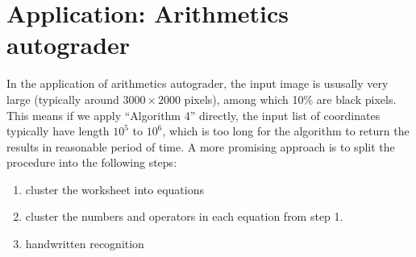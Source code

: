 
\section{Application: Arithmetics autograder}
In the application of arithmetics autograder, the input image is ususally very large (typically around \(3000\times2000\) pixels), among which 10\% are black pixels.
This means if we apply ``Algorithm 4'' directly, the input list of coordinates typically have length \(10^5\) to \(10^6\), which is too long for the algorithm to return the results in reasonable period of time.
A more promising approach is to split the procedure into the following steps:
\begin{enumerate}
    \item cluster the worksheet into equations
    \item cluster the numbers and operators in each equation from step 1.
    \item handwritten recognition
\end{enumerate}

